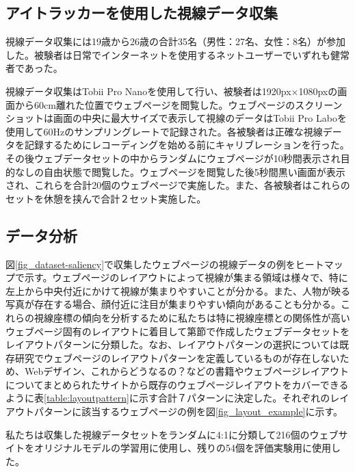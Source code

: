 \subsection{アイトラッカーを使用した視線データ収集}
\par 視線データ収集には19歳から26歳の合計35名（男性：27名、女性：8名）が参加した。被験者は日常でインターネットを使用するネットユーザーでいずれも健常者であった。

\par 視線データ収集はTobii Pro Nano\cite{tobiipronano}を使用して行い、被験者は1920px×1080pxの画面から60cm離れた位置でウェブページを閲覧した。ウェブページのスクリーンショットは画面の中央に最大サイズで表示して視線のデータはTobii Pro Labo\cite{tobiiprolabo}を使用して60Hzのサンプリングレートで記録された。各被験者は正確な視線データを記録するためにレコーディングを始める前にキャリブレーションを行った。その後ウェブデータセットの中からランダムにウェブページが10秒間表示され目的なしの自由状態で閲覧した。ウェブページを閲覧した後5秒間黒い画面が表示され、これらを合計20個のウェブページで実施した。また、各被験者はこれらのセットを休憩を挟んで合計２セット実施した。


\subsection{データ分析}
\par 図\ref{fig_dataset-saliency}で収集したウェブページの視線データの例をヒートマップで示す。ウェブページのレイアウトによって視線が集まる領域は様々で、特に左上から中央付近にかけて視線が集まりやすいことが分かる。また、人物が映る写真が存在する場合、顔付近に注目が集まりやすい傾向があることも分かる。これらの視線座標の傾向を分析するために私たちは特に視線座標との関係性が高いウェブページ固有のレイアウトに着目して第\label{subsec:webdataset}節で作成したウェブデータセットをレイアウトパターンに分類した。なお、レイアウトパターンの選択については既存研究でウェブページのレイアウトパターンを定義しているものが存在しないため、Webデザイン、これからどうなるの？\cite{bookwebdesign}などの書籍やウェブページレイアウトについてまとめられたサイトから既存のウェブページレイアウトをカバーできるように表\ref{table:layoutpattern}に示す合計７パターンに決定した。それぞれのレイアウトパターンに該当するウェブページの例を図\ref{fig_layout_example}に示す。


私たちは収集した視線データセットをランダムに4:1に分類して216個のウェブサイトをオリジナルモデルの学習用に使用し、残りの54個を評価実験用に使用した。

